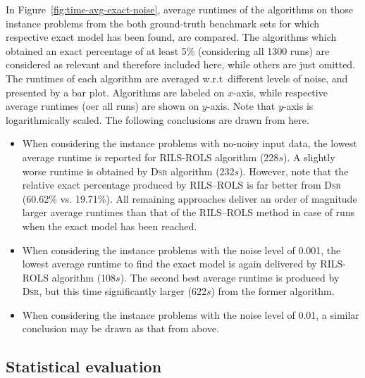 \documentclass[a4paper,12pt]{elsarticle}
\begin{document}
In Figure~\ref{fig:time-avg-exact-noise}, average runtimes of the algorithms on those instance problems from the both ground-truth benchmark sets for which respective exact model has  been found, are compared. The algorithms which obtained an exact percentage of at least 5\% (considering all 1300 runs) are considered as relevant  and therefore included here, while others are just omitted.  The runtimes of each algorithm  are averaged w.r.t\  different levels of noise, and presented by a bar plot. Algorithms are labeled on $x$-axis, while respective average runtimes (oer all runs) are shown on $y$-axis. Note that $y$-axis is logarithmically scaled. The following conclusions are drawn from here.

\begin{itemize}
	\item When considering the instance problems with no-noisy input data, the lowest average runtime  is reported for \textsc{RILS}-\textsc{ROLS} algorithm (228$s$). A slightly worse runtime is obtained by \textsc{Dsr} algorithm (232$s$).  However, note that the relative exact percentage produced by \textsc{RILS}--\textsc{ROLS} is far better from \textsc{Dsr} (60.62\% vs. 19.71\%). 	All remaining approaches deliver an order of magnitude larger average runtimes than that of the \textsc{RILS}--\textsc{ROLS} method in case of runs when the exact model has been reached.   
	\item  When considering the instance problems with the noise level of 0.001,    the lowest average runtime  to find the exact model is again delivered by \textsc{RILS}-\textsc{ROLS} algorithm (108$s$). The second best average runtime is produced by \textsc{Dsr}, but this time significantly larger (622$s$) from the former algorithm. 
	\item When considering the instance problems with the noise level of 0.01, a similar conclusion may be drawn as that from above. 
\end{itemize}



\subsection{Statistical evaluation}
\end{document}
